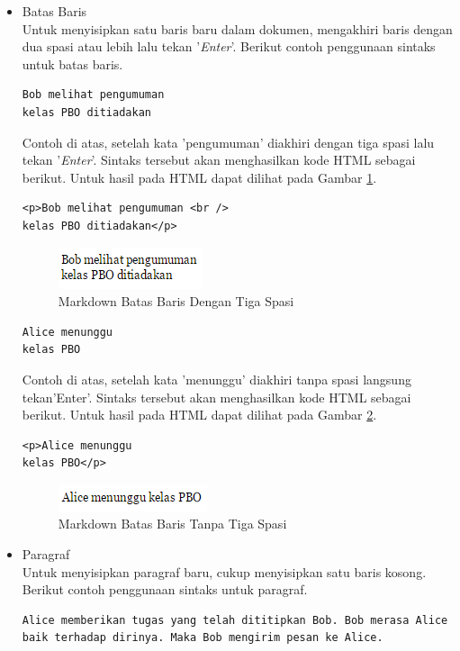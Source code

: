 \begin{itemize}
\item Batas Baris\\
Untuk menyisipkan satu baris baru dalam dokumen, mengakhiri baris dengan dua spasi atau lebih lalu tekan '{\it Enter}'. Berikut contoh penggunaan sintaks untuk batas baris.
\begin{lstlisting}[basicstyle=\footnotesize]
Bob melihat pengumuman   
kelas PBO ditiadakan
\end{lstlisting}
Contoh di atas, setelah kata 'pengumuman' diakhiri dengan tiga spasi lalu tekan '{\it Enter}'. Sintaks tersebut akan menghasilkan kode HTML sebagai berikut. Untuk hasil pada HTML dapat dilihat pada Gambar \ref{fig:dengan}.
\begin{lstlisting}[basicstyle=\footnotesize]
<p>Bob melihat pengumuman <br />
kelas PBO ditiadakan</p>
\end{lstlisting}
\begin{figure}[H]
\centering
\includegraphics[scale=1]{Gambar/dengan.png}
\caption[Markdown Batas Baris Dengan Tiga Spasi]{Markdown Batas Baris
Dengan Tiga Spasi}
\label{fig:dengan}
\end{figure}
\begin{lstlisting}[basicstyle=\footnotesize]
Alice menunggu
kelas PBO
\end{lstlisting}
Contoh di atas, setelah kata 'menunggu' diakhiri tanpa spasi langsung tekan'Enter'. Sintaks tersebut akan menghasilkan kode HTML sebagai berikut. Untuk hasil pada HTML dapat dilihat pada Gambar \ref{fig:tanpa}.
\begin{lstlisting}[basicstyle=\footnotesize]
<p>Alice menunggu
kelas PBO</p>
\end{lstlisting}
\begin{figure}[H]
\centering
\includegraphics[scale=1]{Gambar/tanpa.png}
\caption[Markdown Batas Baris Tanpa Tiga Spasi]{Markdown Batas Baris
Tanpa Tiga Spasi}
\label{fig:tanpa}
\end{figure}

\item Paragraf\\
Untuk menyisipkan paragraf baru, cukup menyisipkan satu baris kosong. Berikut contoh penggunaan sintaks untuk paragraf.
\begin{lstlisting}[basicstyle=\footnotesize]
Alice memberikan tugas yang telah dititipkan Bob. Bob merasa Alice baik terhadap dirinya. Maka Bob mengirim pesan ke Alice.


\end{lstlisting}
\end{itemize}
